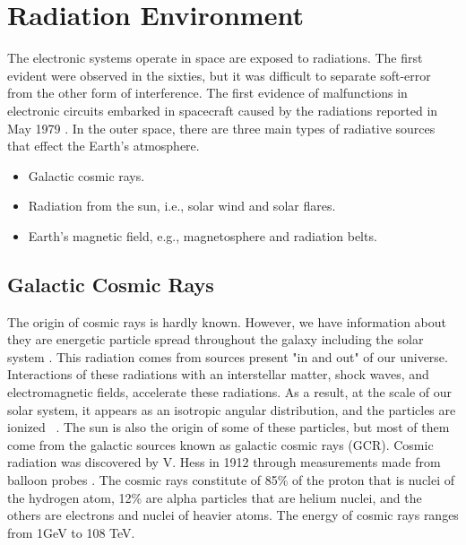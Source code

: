 \section{Radiation Environment}


The electronic systems operate in space are exposed to radiations. The first evident were observed in the sixties, but it was difficult to separate soft-error from the other form of interference. The first evidence of malfunctions in electronic circuits embarked in spacecraft caused by the radiations reported in May 1979 \citep{may1979alpha}. In the outer space, there are three main types of radiative sources that effect the Earth's atmosphere.

\begin{itemize}

\item Galactic cosmic rays.

\item Radiation from the sun, i.e., solar wind and solar flares.

\item Earth's magnetic field, e.g., magnetosphere and radiation belts.

\end{itemize}


\subsection{Galactic Cosmic Rays} 

The origin of cosmic rays is hardly known. However, we have information about they are energetic particle spread throughout the galaxy including the solar system \citep{SWE2016}. This radiation comes from sources present "in and out" of our
universe. Interactions of these radiations with an interstellar matter, shock waves, and electromagnetic fields, accelerate these radiations. As a result, at the scale of our
solar system, it appears as an isotropic angular distribution, and the particles are ionized~ \citep{SWE2016}. The sun is also the origin of some of these particles, but most of them come from the galactic sources known as galactic cosmic rays (GCR).
Cosmic radiation was discovered by V. Hess in 1912 through measurements made from balloon probes \citep{cronin1999cosmic}. The cosmic rays constitute of 85\% of the proton that is nuclei of the hydrogen atom, 12\% are alpha particles that are helium nuclei, and the others are electrons and nuclei of heavier atoms. The energy of cosmic rays ranges from 1GeV to 108 TeV. 


